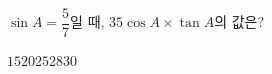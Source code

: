 $\sin A=\dfrac{5}{7}$일 때, $35\cos A\times\tan A$의 값은? 
\begin{choices32}{$15$}{$20$}{$25$}{$28$}{$30$}\end{choices32}
